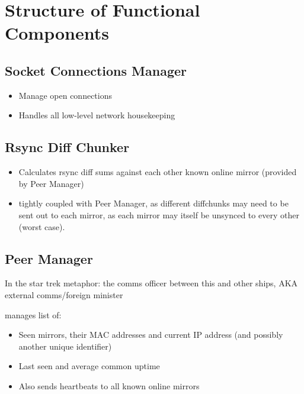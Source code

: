 \documentclass[12pt,a4paper,]{book}
\begin{document}
\section{Structure of Functional
Components}\label{structure-of-functional-components}

\subsection{Socket Connections
Manager}\label{socket-connections-manager}

\begin{itemize}
\itemsep1pt\parskip0pt
\item
  Manage open connections
\item
  Handles all low-level network housekeeping
\end{itemize}

\subsection{Rsync Diff Chunker}\label{rsync-diff-chunker}

\begin{itemize}
\itemsep1pt\parskip0pt
\item
  Calculates rsync diff sums against each other known online mirror
  (provided by Peer Manager)
\item
  tightly coupled with Peer Manager, as different diffchunks may need to
  be sent out to each mirror, as each mirror may itself be unsynced to
  every other (worst case).
\end{itemize}

\subsection{Peer Manager}\label{peer-manager}

In the star trek metaphor: the comms officer between this and other
ships, AKA external comms/foreign minister

manages list of:

\begin{itemize}
\itemsep1pt\parskip0pt
\item
  Seen mirrors, their MAC addresses and current IP address (and possibly
  another unique identifier)
\item
  Last seen and average common uptime
\item
  Also sends heartbeats to all known online mirrors
\end{itemize}
\end{document}
